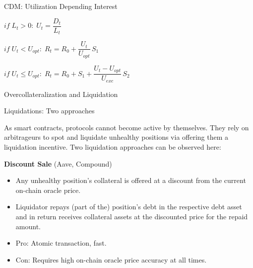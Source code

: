 \documentclass[handout]{beamer}
\begin{document}
\begin{frame}{CDM: Utilization Depending Interest }

$if \;L_t > 0 : \; U_t = \dfrac{D_t}{L_t}$

\vspace{1em}

$if \;  U_t < U_{opt} : \; R_t = R_0 + \dfrac{U_t} {U_{opt}}  \, S_1$

\vspace{1em}

$if \; U_t \leq U_{opt} : \; R_t = R_0 + S_1 + \dfrac{U_t - U_{opt}}{U_{exc}}\, S_2$
	
\end{frame}


\begin{frame}{Overcollateralization and Liquidation}

	
\end{frame}


\begin{frame}{Liquidations: Two approaches }

As smart contracts, protocols cannot become active by themselves. They rely on arbitrageurs to spot and liquidate unhealthy positions via offering them a liquidation incentive. Two  liquidation approaches can be observed here:

\vspace{1em}

\textbf{Discount Sale} (Aave, Compound)

\begin{itemize}
\item Any unhealthy position’s collateral is offered at a discount from the current on-chain oracle price.
\item Liquidator repays (part of the) position’s debt in the respective debt asset and in return receives collateral assets at the discounted price for the repaid amount.
\item Pro: Atomic transaction, fast.
\item Con: Requires high on-chain oracle price accuracy at all times. 

\end{itemize}

	
\end{frame}
\end{document}
